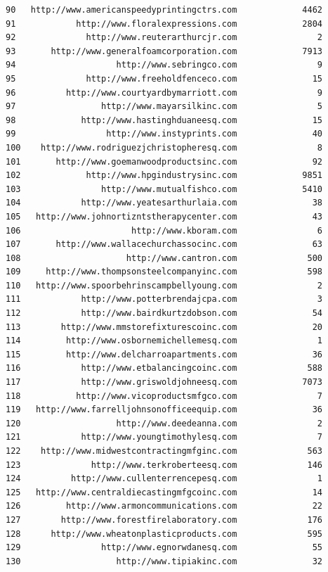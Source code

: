 \documentclass[
  12pt,
]{article}
\begin{document}
\begin{verbatim}
90   http://www.americanspeedyprintingctrs.com             4462
91            http://www.floralexpressions.com             2804
92              http://www.reuterarthurcjr.com                2
93       http://www.generalfoamcorporation.com             7913
94                    http://www.sebringco.com                9
95              http://www.freeholdfenceco.com               15
96          http://www.courtyardbymarriott.com                9
97                 http://www.mayarsilkinc.com                5
98             http://www.hastinghduaneesq.com               15
99                  http://www.instyprints.com               40
100    http://www.rodriguezjchristopheresq.com                8
101       http://www.goemanwoodproductsinc.com               92
102             http://www.hpgindustrysinc.com             9851
103                http://www.mutualfishco.com             5410
104            http://www.yeatesarthurlaia.com               38
105   http://www.johnortizntstherapycenter.com               43
106                      http://www.kboram.com                6
107       http://www.wallacechurchassocinc.com               63
108                     http://www.cantron.com              500
109     http://www.thompsonsteelcompanyinc.com              598
110   http://www.spoorbehrinscampbellyoung.com                2
111            http://www.potterbrendajcpa.com                3
112            http://www.bairdkurtzdobson.com               54
113        http://www.mmstorefixturescoinc.com               20
114         http://www.osbornemichellemesq.com                1
115         http://www.delcharroapartments.com               36
116            http://www.etbalancingcoinc.com              588
117            http://www.griswoldjohneesq.com             7073
118           http://www.vicoproductsmfgco.com                7
119   http://www.farrelljohnsonofficeequip.com               36
120                   http://www.deedeanna.com                2
121            http://www.youngtimothylesq.com                7
122    http://www.midwestcontractingmfginc.com              563
123              http://www.terkroberteesq.com              146
124          http://www.cullenterrencepesq.com                1
125   http://www.centraldiecastingmfgcoinc.com               14
126         http://www.armoncommunications.com               22
127        http://www.forestfirelaboratory.com              176
128      http://www.wheatonplasticproducts.com              595
129                http://www.egnorwdanesq.com               55
130                   http://www.tipiakinc.com               32

\end{verbatim}
\end{document}
